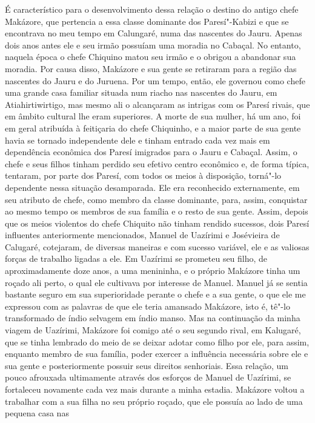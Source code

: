 É característico para
o desenvolvimento dessa relação o destino do antigo chefe Makázore, que
pertencia a essa classe dominante dos Paresí"-Kabizi e que se encontrava
no meu tempo em Calungaré, numa das nascentes do Jauru. Apenas dois
anos antes ele e seu irmão possuíam uma moradia no Cabaçal. No entanto,
naquela época o chefe Chiquino matou seu irmão e o obrigou a abandonar
sua moradia. Por causa disso, Makázore e sua gente se retiraram para a
região das nascentes do Jauru e do Juruena. Por um tempo, então, ele
governou como chefe uma grande casa familiar situada num riacho nas
nascentes do Jauru, em Atiahirtiwirtigo, mas mesmo ali o alcançaram as
intrigas com os Paresí rivais, que em âmbito cultural lhe eram
superiores. A morte de sua mulher, há um ano, foi em geral atribuída à
feitiçaria do chefe Chiquinho, e a maior parte de sua gente havia se
tornado independente dele e tinham entrado cada vez mais em dependência
econômica dos Paresí imigrados para o Jauru e Cabaçal. Assim, o chefe e
seus filhos tinham perdido seu efetivo centro econômico e, de forma
típica, tentaram, por parte dos Paresí, com todos os meios à
disposição, torná"-lo dependente nessa situação desamparada. Ele era
reconhecido externamente, em seu atributo de chefe, como membro da
classe dominante, para, assim, conquistar ao mesmo tempo os membros de
sua família e o resto de sua gente. Assim, depois que os meios violentos
do chefe Chiquito não tinham rendido sucessos, dois Paresí influentes
anteriormente mencionados, Manuel de Uazírimi e Josévieira de
Calugaré, cotejaram, de diversas maneiras e com sucesso variável, ele e
as valiosas forças de trabalho ligadas a ele. Em Uazírimi se prometeu
seu filho, de aproximadamente doze anos, a uma menininha, e o próprio
Makázore tinha um roçado ali perto, o qual ele cultivava por interesse
de Manuel. Manuel já se sentia bastante seguro em sua superioridade
perante o chefe e a sua gente, o que ele me expressou com as palavras de
que ele teria amansado Makázore, isto é, tê"-lo transformado de índio
selvagem em índio manso. Mas na continuação da minha viagem de
Uazírimi, Makázore foi comigo até o seu segundo rival, em Kalugaré, que
se tinha lembrado do meio de se deixar adotar como filho por ele, para
assim, enquanto membro de sua família, poder exercer a influência
necessária sobre ele e sua gente e posteriormente possuir seus direitos
senhoriais. Essa relação, um pouco afrouxada ultimamente através dos
esforços de Manuel de Uazírimi, se fortaleceu novamente cada vez mais
durante a minha estadia. Makázore voltou a trabalhar com a sua filha no
seu próprio roçado, que ele possuía ao lado de uma pequena casa nas
